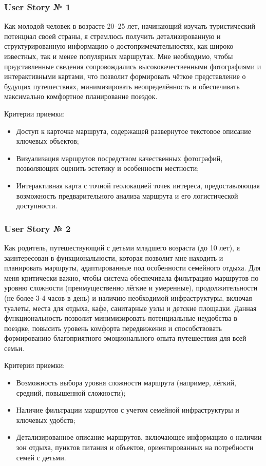 \subsubsection*{User Story № 1} 
Как молодой человек в возрасте 20–25 лет, начинающий изучать туристический потенциал своей страны, я стремлюсь получить детализированную и структурированную информацию о достопримечательностях, как широко известных, так и менее популярных маршрутах. Мне необходимо, чтобы представленные сведения сопровождались высококачественными фотографиями и интерактивными картами, что позволит формировать чёткое представление о будущих путешествиях, минимизировать неопределённость и обеспечивать максимально комфортное планирование поездок.

Критерии приемки:
\begin{itemize}
    \item 	Доступ к карточке маршрута, содержащей развернутое текстовое описание ключевых объектов;
    \item 	Визуализация маршрутов посредством качественных фотографий, позволяющих оценить эстетику и особенности местности;
    \item 	Интерактивная карта с точной геолокацией точек интереса, предоставляющая возможность предварительного анализа маршрута и его логистической доступности.
\end{itemize}

\subsubsection*{User Story № 2} 
Как родитель, путешествующий с детьми младшего возраста (до 10 лет), я заинтересован в функциональности, которая позволит мне находить и планировать маршруты, адаптированные под особенности семейного отдыха. Для меня критически важно, чтобы система обеспечивала фильтрацию маршрутов по уровню сложности (преимущественно лёгкие и умеренные), продолжительности (не более 3-4 часов в день) и наличию необходимой инфраструктуры, включая туалеты, места для отдыха, кафе, санитарные узлы и детские площадки. Данная функциональность позволит минимизировать потенциальные неудобства в поездке, повысить уровень комфорта передвижения и способствовать формированию благоприятного эмоционального опыта путешествия для всей семьи.

Критерии приемки:
\begin{itemize}
    \item 	Возможность выбора уровня сложности маршрута (например, лёгкий, средний, повышенной сложности);
    \item 	Наличие фильтрации маршрутов с учетом семейной инфраструктуры и ключевых удобств;
    \item 	Детализированное описание маршрутов, включающее информацию о наличии зон отдыха, пунктов питания и объектов, ориентированных на потребности семей с детьми.
\end{itemize}


